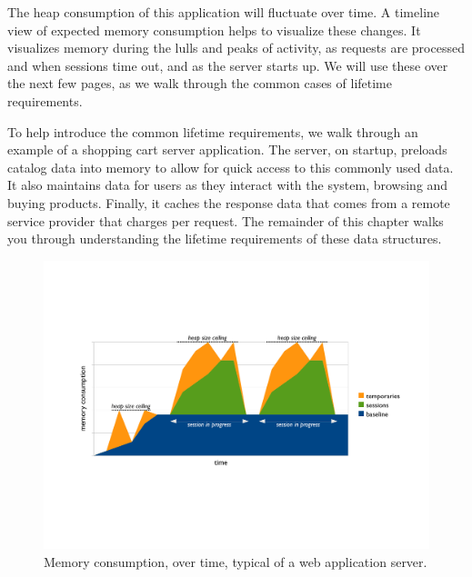 The heap consumption of this application will fluctuate over time. A timeline
view of expected memory consumption helps to visualize these changes. It
visualizes memory during the lulls and peaks of activity, as requests are
processed and when sessions time out, and as the server starts up. We will use
these over the next few pages, as we walk through the common cases of lifetime
requirements.




To help introduce the common lifetime requirements, we walk through an example of
a shopping cart server application. The server, on startup, preloads catalog data
into memory to allow for quick access to this commonly used data. It also
maintains data for users as they interact with the system, browsing and buying
products. Finally, it caches the response data that comes from a remote service
provider that charges per request. The remainder of this chapter walks you
through understanding the lifetime requirements of these data structures.

\begin{figure}
	\centering
	\includegraphics[width=\textwidth]{part4/Figures/lifetime/timeline-base-session-temps}
	\caption{Memory consumption, over time, typical of a web application server.}
	\label{fig:timeline-base-session-temps}
\end{figure}

